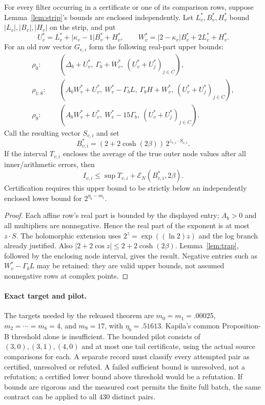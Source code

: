 \begin{proposition}\label{prop:validated}
For every filter occurring in a certificate or one of its comparison rows,
suppose Lemma~\ref{lem:strip}'s bounds are enclosed independently. Let
$L_v^*,B_v^*,H_v^*$ bound $|L_v|,|B_v|,|H_v|$ on the strip, and put
\[
 U_v^*=L_v^*+|\kappa_v-1|B_v^*+H_v^*,\qquad
 W_v^*=|2-\kappa_v|B_v^*+2L_v^*+H_v^*.
\]
For an old row vector $G_{v,i}$ form the following real-part upper bounds:
\begin{align*}
 \rho_0:&\quad (\Delta_b+U_v^*,\ \Gamma_b+W_v^*,\
                       (U_v^*+U_j^*)_{j\in C}),\\
 \rho_{1:8}:&\quad (A_bW_v^*+U_v^*,\ W_v^*-\Gamma_bL,\
                  \Gamma_bH+W_v^*,\ (U_v^*+U_j^*)_{j\in C}),\\
 \rho_9:&\quad (A_bW_v^*+U_v^*,\ W_v^*-15\Gamma_b,\
                       (U_v^*+U_j^*)_{j\in C}).
\end{align*}
Call the resulting vector $S_{v,i}$ and set
\[
 B_{v,i}^*=(2+2\cosh(2\beta))\,2^{z_{v,i}\cdot S_{v,i}}.
\]
If the interval $T_{v,i}$ encloses the average of the true outer node
values after all inner/arithmetic errors, then
\[
 I_{v,i}\le \sup T_{v,i}+\mathcal E_N(B_{v,i}^*,2\beta).
\]
Certification requires this upper bound to be strictly below an
independently enclosed lower bound for $2^{\eta_b-m_i}$.
\end{proposition}
\begin{proof}
Each affine row's real part is bounded by the displayed entry;
$A_b>0$ and all multipliers are nonnegative. Hence the real part of
the exponent is at most $z\cdot S$. The holomorphic extension uses
$2^z=\exp((\ln2)z)$ and the log branch already justified. Also
$|2+2\cos z|\le2+2\cosh(2\beta)$. Lemma~\ref{lem:trap}, followed
by the enclosing node interval, gives the result. Negative entries
such as $W_v^*-\Gamma_bL$ may be retained: they are valid upper bounds,
not assumed nonnegative rows at complex points.
\end{proof}

\paragraph{Exact target and pilot.}
The targets needed by the released theorem are $m_0=m_1=.00025$,
$m_2=\cdots=m_8=4$, and $m_9=17$, with $\eta_b=.51613$.
Kapila's common Proposition-B threshold alone is insufficient.
The bounded pilot consists of $(3,0),(3,1),(4,0)$ and at most one tail
certificate, using the actual source comparisons for each. A separate
record must classify every attempted pair as certified, unresolved or
refuted. A failed sufficient bound is unresolved, not a refutation;
a certified lower bound above threshold would be a refutation.
If bounds are rigorous and the measured cost permits the finite full
batch, the same contract can be applied to all 430 distinct pairs.

